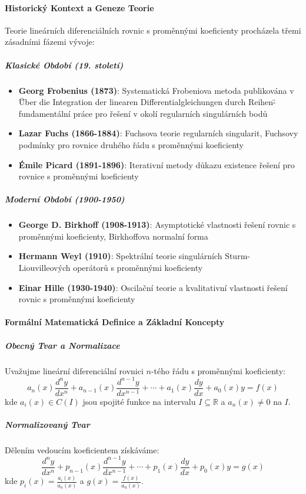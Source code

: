 \paragraph*{Historický Kontext a Geneze Teorie}
Teorie lineárních diferenciálních rovnic s proměnnými koeficienty procházela třemi zásadními fázemi vývoje:

\subparagraph*{Klasické Období (19. století)}
\begin{itemize}
\item \textbf{Georg Frobenius (1873)}: Systematická Frobeniova metoda publikována v \"Über die Integration der linearen Differentialgleichungen durch Reihen\" - fundamentální práce pro řešení v okolí regularních singulárních bodů
\item \textbf{Lazar Fuchs (1866-1884)}: Fuchsova teorie regularních singularit, Fuchsovy podmínky pro rovnice druhého řádu s proměnnými koeficienty
\item \textbf{Émile Picard (1891-1896)}: Iterativní metody důkazu existence řešení pro rovnice s proměnnými koeficienty
\end{itemize}

\subparagraph*{Moderní Období (1900-1950)}
\begin{itemize}
\item \textbf{George D. Birkhoff (1908-1913)}: Asymptotické vlastnosti řešení rovnic s proměnnými koeficienty, Birkhoffova normalní forma
\item \textbf{Hermann Weyl (1910)}: Spektrální teorie singulárních Sturm-Liouvilleových operátorů s proměnnými koeficienty
\item \textbf{Einar Hille (1930-1940)}: Oscilační teorie a kvalitativní vlastnosti řešení rovnic s proměnnými koeficienty
\end{itemize}

\paragraph*{Formální Matematická Definice a Základní Koncepty}

\subparagraph*{Obecný Tvar a Normalizace}
Uvažujme lineární diferenciální rovnici $n$-tého řádu s proměnnými koeficienty:
\[
a_n(x)\frac{d^ny}{dx^n} + a_{n-1}(x)\frac{d^{n-1}y}{dx^{n-1}} + \cdots + a_1(x)\frac{dy}{dx} + a_0(x)y = f(x)
\]
kde $a_i(x) \in C(I)$ jsou spojité funkce na intervalu $I \subseteq \mathbb{R}$ a $a_n(x) \neq 0$ na $I$.

\subparagraph*{Normalizovaný Tvar}
Dělením vedoucím koeficientem získáváme:
\[
\frac{d^ny}{dx^n} + p_{n-1}(x)\frac{d^{n-1}y}{dx^{n-1}} + \cdots + p_1(x)\frac{dy}{dx} + p_0(x)y = g(x)
\]
kde $p_i(x) = \frac{a_i(x)}{a_n(x)}$ a $g(x) = \frac{f(x)}{a_n(x)}$.

